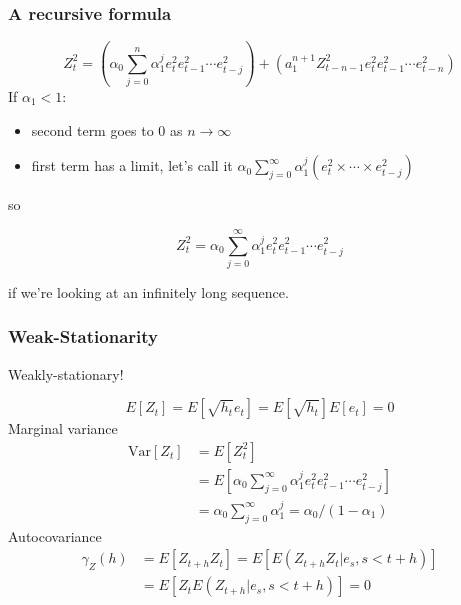 \documentclass{beamer}
\begin{document}

\begin{frame}
\frametitle{A recursive formula}

 
\[
Z_t^2 = \left( \alpha_0 \sum_{j=0}^n \alpha_1^j e_t^2 e_{t-1}^2 \cdots e_{t-j}^2\right) + \left(a_1^{n+1}Z_{t-n-1}^2 e_t^2 e_{t-1}^2 \cdots e_{t-n}^2\right)
\]
If $\alpha_1 < 1$:
\begin{itemize}
\item second term goes to $0$ as $n \to \infty$
\item first term has a limit, let's call it $\alpha_0 \sum_{j=0}^{\infty}\alpha_1^j (e_t^2 \times \cdots \times e_{t-j}^2)$
\end{itemize}
so
\begin{block}{}
\[
Z_t^2 = \alpha_0 \sum_{j=0}^{\infty} \alpha_1^j e_t^2 e_{t-1}^2 \cdots e_{t-j}^2
\]
\end{block}
if we're looking at an infinitely long sequence.
\end{frame}





\begin{frame}
\frametitle{Weak-Stationarity}

Weakly-stationary!

\[
E[Z_t] = E[\sqrt{h_t}e_t] = E[\sqrt{h_t}]E[e_t] = 0
\]
Marginal variance
\begin{align*}
\text{Var}[Z_t] &= E[Z_t^2] \\
&= E[\alpha_0 \sum_{j=0}^{\infty} \alpha_1^j e_t^2 e_{t-1}^2 \cdots e_{t-j}^2] \tag{previous slide}\\
&= \alpha_0 \sum_{j=0}^{\infty} \alpha_1^j = \alpha_0/(1-\alpha_1) \tag{linearity, independence, geom. series}
\end{align*}
Autocovariance
\begin{align*}
\gamma_Z(h) &= E[Z_{t+h}Z_t] = E[E(Z_{t+h}Z_t| e_s, s < t+h)] \tag{LTE} \\
&= E[Z_t E(Z_{t+h}| e_s, s < t+h)] = 0
\end{align*}


\end{frame}

\end{document}
